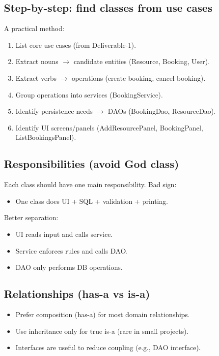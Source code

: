 \documentclass[11pt]{article}
\begin{document}
\subsection{Step-by-step: find classes from use cases}
A practical method:
\begin{enumerate}
  \item List core use cases (from Deliverable-1).
  \item Extract nouns $\rightarrow$ candidate entities (Resource, Booking, User).
  \item Extract verbs $\rightarrow$ operations (create booking, cancel booking).
  \item Group operations into services (BookingService).
  \item Identify persistence needs $\rightarrow$ DAOs (BookingDao, ResourceDao).
  \item Identify UI screens/panels (AddResourcePanel, BookingPanel, ListBookingsPanel).
\end{enumerate}

\subsection{Responsibilities (avoid God class)}
Each class should have one main responsibility.
Bad sign:
\begin{itemize}
  \item One class does UI + SQL + validation + printing.
\end{itemize}
Better separation:
\begin{itemize}
  \item UI reads input and calls service.
  \item Service enforces rules and calls DAO.
  \item DAO only performs DB operations.
\end{itemize}

\subsection{Relationships (has-a vs is-a)}
\begin{itemize}
  \item Prefer composition (has-a) for most domain relationships.
  \item Use inheritance only for true is-a (rare in small projects).
  \item Interfaces are useful to reduce coupling (e.g., DAO interface).
\end{itemize}
\end{document}

